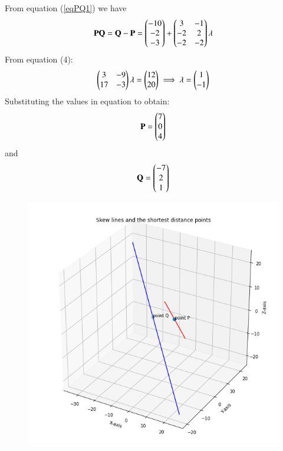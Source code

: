 \documentclass[journal,12pt,twocolumn]{IEEEtran}
\begin{document}
	From equation (\ref{eqPQ1}) we have 
\begin{align}
	\mathbf{PQ} = \mathbf{Q - P} = \begin{pmatrix}-10\\-2\\-3\end{pmatrix} 
		+ \begin{pmatrix}3 & -1 \\ -2 & 2 \\ -2 & -2\end{pmatrix}\mathbf{\lambda}
\end{align}
From equation (4):
\begin{align}
	\begin{pmatrix}3 & -9 \\ 17 & -3\end{pmatrix}\mathbf{\lambda} = \begin{pmatrix}12\\20\end{pmatrix}
	\implies \mathbf{\lambda} = \begin{pmatrix}1\\-1\end{pmatrix}
\end{align}
Substituting the values in equation to obtain:
\begin{align}
	\mathbf{P} = \begin{pmatrix}7\\0\\4\end{pmatrix}
\end{align}
and
\begin{align}
	\mathbf{Q} = \begin{pmatrix}-7\\2\\1\end{pmatrix}
\end{align}
\begin{figure}[htbp]
\centering
	\includegraphics[width=\columnwidth]{skew_lines_plot.png}
	\caption{}
\end{figure}
\end{document}

